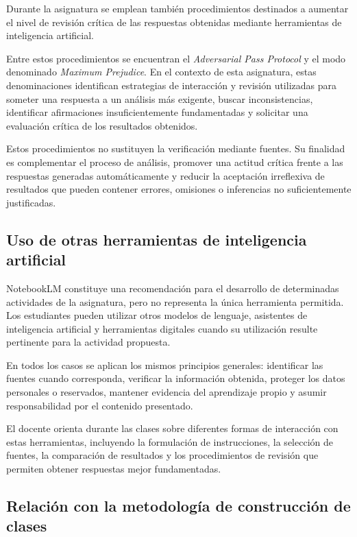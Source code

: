 \documentclass[10pt]{article}
\begin{document}
Durante la asignatura se emplean también procedimientos destinados a aumentar el nivel de revisión crítica de las respuestas obtenidas mediante herramientas de inteligencia artificial.

Entre estos procedimientos se encuentran el \textit{Adversarial Pass Protocol} y el modo denominado \textit{Maximum Prejudice}. En el contexto de esta asignatura, estas denominaciones identifican estrategias de interacción y revisión utilizadas para someter una respuesta a un análisis más exigente, buscar inconsistencias, identificar afirmaciones insuficientemente fundamentadas y solicitar una evaluación crítica de los resultados obtenidos.

Estos procedimientos no sustituyen la verificación mediante fuentes. Su finalidad es complementar el proceso de análisis, promover una actitud crítica frente a las respuestas generadas automáticamente y reducir la aceptación irreflexiva de resultados que pueden contener errores, omisiones o inferencias no suficientemente justificadas.

\subsection{Uso de otras herramientas de inteligencia artificial}

NotebookLM constituye una recomendación para el desarrollo de determinadas actividades de la asignatura, pero no representa la única herramienta permitida. Los estudiantes pueden utilizar otros modelos de lenguaje, asistentes de inteligencia artificial y herramientas digitales cuando su utilización resulte pertinente para la actividad propuesta.

En todos los casos se aplican los mismos principios generales: identificar las fuentes cuando corresponda, verificar la información obtenida, proteger los datos personales o reservados, mantener evidencia del aprendizaje propio y asumir responsabilidad por el contenido presentado.

El docente orienta durante las clases sobre diferentes formas de interacción con estas herramientas, incluyendo la formulación de instrucciones, la selección de fuentes, la comparación de resultados y los procedimientos de revisión que permiten obtener respuestas mejor fundamentadas.

\subsection{Relación con la metodología de construcción de clases}
\end{document}
